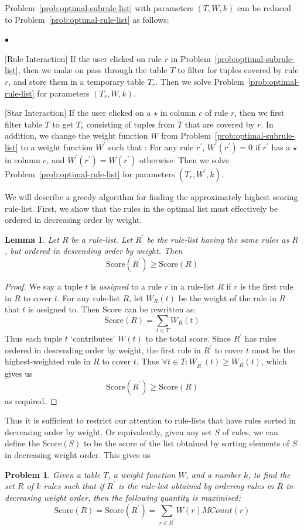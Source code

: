 \documentclass{sig-alternate}
\newtheorem{lemma}{Lemma}
\newcounter{prob}
\newtheorem{problem}[prob]{Problem}
\newcommand{\squishlist}{
   \begin{list}{$\bullet$}
    { \setlength{\itemsep}{0pt}
      \setlength{\parsep}{2pt}
      \setlength{\topsep}{2pt}
      \setlength{\partopsep}{0pt}
    }
}
\newcommand{\squishend}{\end{list}}
\begin{document}
Problem~\ref{prob:optimal-subrule-list} with parameters $(T, W, k)$ can be reduced to Problem~\ref{prob:optimal-rule-list} as follows:
\squishlist
\item $[$Rule Interaction$]$ If the user clicked on rule $r$ in Problem~\ref{prob:optimal-subrule-list}, then we make on pass through the table $T$ to filter for tuples covered by rule $r$, and store them in a temporary table $T_r$. Then we solve Problem~\ref{prob:optimal-rule-list} for parameters $(T_r, W, k)$.
\item $[$Star Interaction$]$ If the user clicked on a $\star$ in column $c$ of rule $r$, then we first filter table $T$ to get $T_r$ consisting of tuples from $T$ that are covered by $r$. In addition, we change the weight function $W$ from Problem~\ref{prob:optimal-subrule-list} to a weight function $W^{\prime}$ such that : For any rule $r^{\prime}$, $W^{\prime}(r^{\prime}) = 0$ if $r^{\prime}$ has a $\star$ in column $c$, and $W^{\prime}(r^{\prime}) = W(r^{\prime})$ otherwise. Then we solve Problem~\ref{prob:optimal-rule-list} for parameters $(T_r, W^{\prime}, k)$.
\squishend

We will describe a greedy algorithm for finding the approximately highest scoring rule-list. First, we show that the rules in the optimal list must effectively be ordered in decreasing order by weight.

\begin{lemma}\label{lemma:rule-ordering}
Let $R$ be a rule-list. Let $R^{\prime}$ be the rule-list having the same rules as $R$, but ordered in descending order by weight. Then
$$\text{Score}(R^{\prime}) \geq \text{Score}(R)$$
\end{lemma}
\begin{proof}
We say a tuple $t$ is {\em assigned} to a rule $r$ in a rule-list $R$ if $r$ is the first rule in $R$ to cover $t$. For any rule-list $R$, let $W_{R}(t)$ be the weight of the rule in $R$ that $t$ is assigned to. Then Score can be rewritten as:
$$\text{Score}(R) = \sum_{t\in T}W_{R}(t)$$
Thus each tuple $t$ `contributes' $W(t)$ to the total score. Since $R^{\prime}$ has rules ordered in descending order by weight, the first rule in $R^{\prime}$ to cover $t$ must be the highest-weighted rule in $R$ to cover $t$. Thus $\forall t \in T : W_{R^{\prime}}(t) \geq W_{R}(t) $, which gives us
$$\text{Score}(R^{\prime}) \geq \text{Score}(R)$$
as required.
\end{proof}

Thus it is sufficient to restrict our attention to rule-lists that have rules sorted in decreasing order by weight. Or equivalently, given any set $S$ of rules, we can define the Score$(S)$ to be the score of the list obtained by sorting elements of $S$ in decreasing weight order. This gives us 
\begin{problem}\label{prob:optimal-rule-set}
Given a table $T$, a weight function $W$, and a number $k$, to find the set $R$ of $k$ rules such that if $R^{\prime}$ is the rule-list obtained by ordering rules in $R$ in decreasing weight order, then the following quantity is maximised:
$$\text{Score}(R) = \text{Score}(R^{\prime}) = \sum_{r \in R^{\prime}}W(r)MCount(r)$$
\end{problem}
\end{document}
